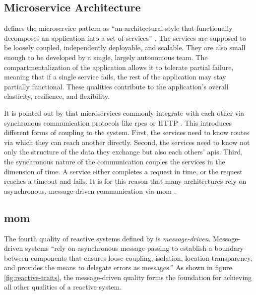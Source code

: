 \subsection{Microservice Architecture}

\citeauthor{richardson_microservices_2019} defines the microservice pattern as \enquote{an architectural style that functionally decomposes an application into a set of services} \parencite[11]{richardson_microservices_2019}.
The services are supposed to be loosely coupled, independently deployable, and scalable.
They are also small enough to be developed by a single, largely autonomous team.
The compartmentalization of the application allows it to tolerate partial failure, meaning that if a single service fails, the rest of the application may stay partially functional.
\parencite[14f.]{richardson_microservices_2019}
These qualities contribute to the application's overall elasticity, resilience, and flexibility.

It is pointed out by \citeauthor{fowler_microservices_2014} that microservices commonly integrate with each other via synchronous communication protocols like \glspl{rpc} or HTTP \parencite{fowler_microservices_2014}.
This introduces different forms of coupling to the system.
First, the services need to know routes via which they can reach another directly.
Second, the services need to know not only the structure of the data they exchange but also each others' \glspl{api}.
Third, the synchronous nature of the communication couples the services in the dimension of time.
A service either completes a request in time, or the request reaches a timeout and fails.
It is for this reason that many architectures rely on asynchronous, message-driven communication via \gls{mom} \parencite{fowler_microservices_2014}.

\subsection{\acrlong{mom}}\label{sec:mom}

The fourth quality of reactive systems defined by \cite{boner_reactive_2014} is \emph{message-driven}.
Message-driven systems \enquote{rely on asynchronous message-passing to
establish a boundary between components that ensures loose coupling, isolation,
location transparency, and provides the means to delegate errors as messages.} \parencite{boner_reactive_2014}
As shown in figure \ref{fig:reactive-traits}, the message-driven quality forms the foundation for achieving all other qualities of a reactive system.

